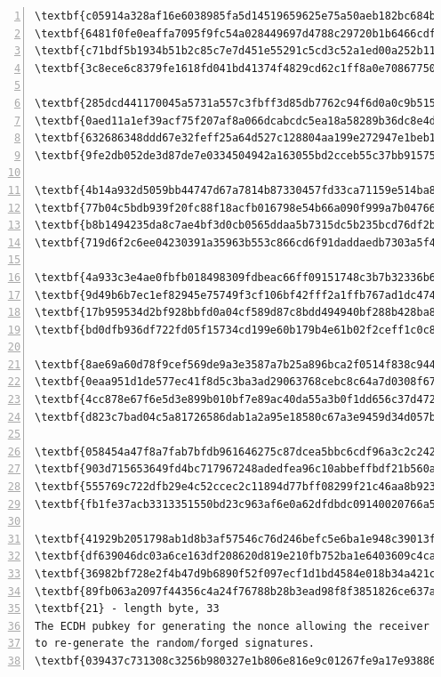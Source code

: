 \documentclass[10pt,a4paper]{article}
\begin{document}
\begin{Verbatim}[commandchars=\\\{\},numbers=left]
\textbf{c05914a328af16e6038985fa5d14519659625e75a50aeb182bc684bc3681b073}
\textbf{6481f0fe0eaffa7095f9fc54a028449697d4788c29720b1b6466cdf65ab888f7}
\textbf{c71bdf5b1934b51b2c85c7e7d451e55291c5cd3c52a1ed00a252b117fd566797}
\textbf{3c8ece6c8379fe1618fd041bd41374f4829cd62c1ff8a0e708677501a23d357a}

\textbf{285dcd441170045a5731a557c3fbff3d85db7762c94f6d0a0c9b5154ec816410}
\textbf{0aed11a1ef39acf75f207af8a066dcabcdc5ea18a58289b36dc8e4dbaf7eb792}
\textbf{632686348ddd67e32feff25a64d527c128804aa199e272947e1beb191e1bd6b8}
\textbf{9fe2db052de3d87de7e0334504942a163055bd2cceb55c37bb91575a46a8e00d}

\textbf{4b14a932d5059bb44747d67a7814b87330457fd33ca71159e514ba8050101be2}
\textbf{77b04c5bdb939f20fc88f18acfb016798e54b66a090f999a7b04766ce48d1d33}
\textbf{b8b1494235da8c7ae4bf3d0cb0565ddaa5b7315dc5b235bcd76df2b74c636c21}
\textbf{719d6f2c6ee04230391a35963b553c866cd6f91daddaedb7303a5f4030cd8725}

\textbf{4a933c3e4ae0fbfb018498309fdbeac66ff09151748c3b7b32336b69d0f4a69e}
\textbf{9d49b6b7ec1ef82945e75749f3cf106bf42fff2a1ffb767ad1dc474eeaf058dc}
\textbf{17b959534d2bf928bbfd0a04cf589d87c8bdd494940bf288b428ba8b840e2d93}
\textbf{bd0dfb936df722fd05f15734cd199e60b179b4e61b02f2ceff1c0c8ef426d610}

\textbf{8ae69a60d78f9cef569de9a3e3587a7b25a896bca2f0514f838c944619334806}
\textbf{0eaa951d1de577ec41f8d5c3ba3ad29063768cebc8c64a7d0308f67db5dc7f67}
\textbf{4cc878e67f6e5d3e899b010bf7e89ac40da55a3b0f1dd656c37d47281683a08d}
\textbf{d823c7bad04c5a81726586dab1a2a95e18580c67a3e9459d34d057b938050370}

\textbf{058454a47f8a7fab7bfdb961646275c87dcea5bbc6cdf96a3c2c2420988461e7}
\textbf{903d715653649fd4bc717967248adedfea96c10abbeffbdf21b560a4e3b3caf4}
\textbf{555769c722dfb29e4c52ccec2c11894d77bff08299f21c46aa8b92399a7b9584}
\textbf{fb1fe37acb3313351550bd23c963af6e0a62dfdbdc09140020766a5329929163}

\textbf{41929b2051798ab1d8b3af57546c76d246befc5e6ba1e948c39013fa87fb6a80}
\textbf{df639046dc03a6ce163df208620d819e210fb752ba1e6403609c4ca123645be5}
\textbf{36982bf728e2f4b47d9b6890f52f097ecf1d1bd4584e018b34a421c1bb9b55c7}
\textbf{89fb063a2097f44356c4a24f76788b28b3ead98f8f3851826ce637a6b31c13ec}
\textbf{21} - length byte, 33
The ECDH pubkey for generating the nonce allowing the receiver
to re-generate the random/forged signatures.
\textbf{039437c731308c3256b980327e1b806e816e9c01267fe9a17e938864344148a8cf}
\end{Verbatim}
\end{document}
